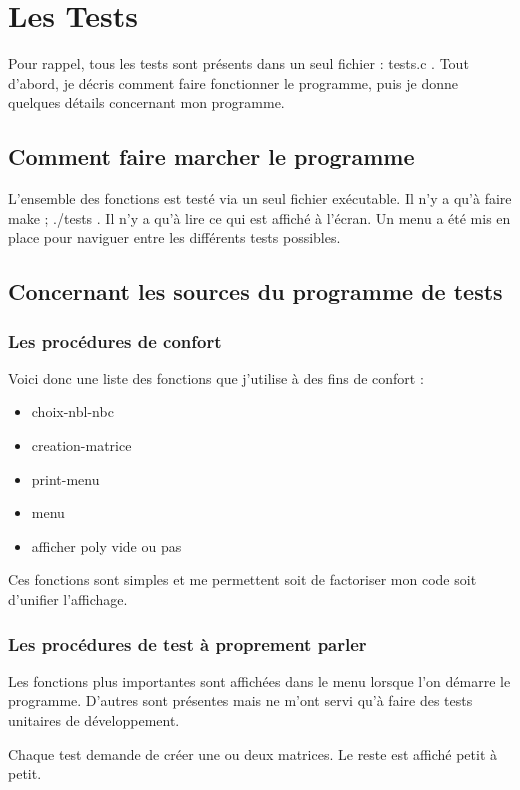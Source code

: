 \chapter{Les Tests}

Pour rappel, tous les tests sont présents dans un seul fichier : tests.c .
Tout d'abord, je décris comment faire fonctionner le programme, puis je donne quelques détails concernant mon programme.

\section{Comment faire marcher le programme}

L'ensemble des fonctions est testé via un seul fichier exécutable. Il n'y a qu'à faire make ; ./tests .
Il n'y a qu'à lire ce qui est affiché à l'écran.
Un menu a été mis en place pour naviguer entre les différents tests possibles.

\section{Concernant les sources du programme de tests}
\subsection{Les procédures de confort}

Voici donc une liste des fonctions que j'utilise à des fins de confort : 
\begin{itemize}
	\item choix-nbl-nbc
	\item creation-matrice
	\item print-menu
	\item menu
	\item afficher poly vide ou pas
\end{itemize}

Ces fonctions sont simples et me permettent soit de factoriser mon code soit d'unifier l'affichage.

\subsection{Les procédures de test à proprement parler}
Les fonctions plus importantes sont affichées dans le menu lorsque l'on démarre le programme.
D'autres sont présentes mais ne m'ont servi qu'à faire des tests unitaires de développement.

Chaque test demande de créer une ou deux matrices. Le reste est affiché petit à petit.

\clearpage
